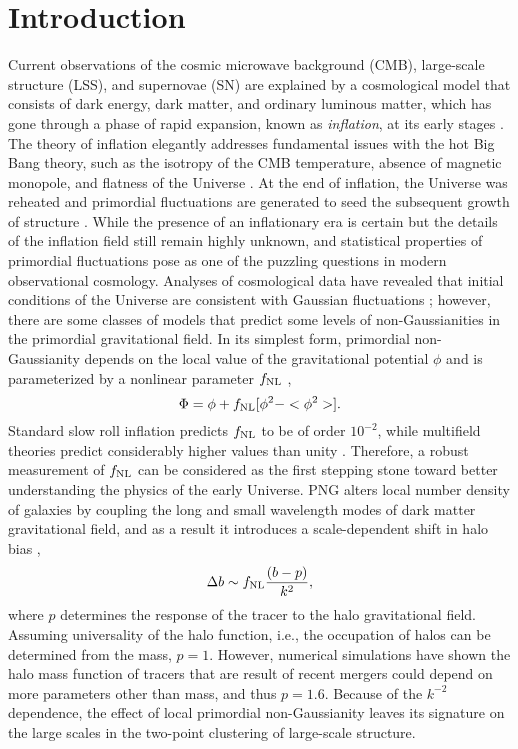 \section{Introduction}
\label{sec:introduction}
Current observations of the cosmic microwave background (CMB), large-scale structure (LSS), and supernovae (SN) are explained by a cosmological model that consists of dark energy, dark matter, and ordinary luminous matter, which has gone through a phase of rapid expansion, known as \textit{inflation},  at its early stages \citep[see, e.g.,][]{weinberg2013observational}. The theory of inflation elegantly addresses fundamental issues with the hot Big Bang theory, such as the isotropy of the CMB temperature, absence of magnetic monopole, and flatness of the Universe . At the end of inflation, the Universe was reheated and primordial fluctuations are generated to seed the subsequent growth of structure . While the presence of an inflationary era is certain but the details of the inflation field still remain highly unknown, and statistical properties of primordial fluctuations pose as one of the puzzling questions in modern observational cosmology. Analyses of cosmological data have revealed that initial conditions of the Universe are consistent with Gaussian fluctuations ; however, there are some classes of models that predict some levels of non-Gaussianities in the primordial gravitational field. In its simplest form, primordial non-Gaussianity depends on the local value of the gravitational potential $\phi$ and is parameterized by a nonlinear parameter $f_{\rm NL}$ \citep{komatsu2001acoustic},
\begin{equation}
    \Phi = \phi + f_{\rm NL} [\phi^{2} -  <\phi^{2}>].
\end{equation}
Standard slow roll inflation predicts $f_{\rm NL}$ to be of order $10^{-2}$, while multifield theories predict considerably higher values than unity . Therefore, a robust measurement of $f_{\rm NL}$ can be considered as the first stepping stone toward better understanding the physics of the early Universe.  PNG alters local number density of galaxies by coupling the long and small wavelength modes of dark matter gravitational field, and as a result it introduces a scale-dependent shift in halo bias \citep[see, e.g.,][]{dalal2008imprints, slosar2008constraints},
\begin{equation}\label{eq:db}
\Delta b \sim f_{\rm NL} \frac{(b - p)}{k^{2}},
\end{equation}
where $p$ determines the response of the tracer to the halo gravitational field. Assuming universality of the halo function, i.e., the occupation of halos can be determined from the mass, $p=1$. However, numerical simulations have shown the halo mass function of tracers that are result of recent mergers could depend on more parameters other than mass, and thus $p=1.6$.  Because of the $k^{-2}$ dependence, the effect of local primordial non-Gaussianity leaves its signature on the large scales in the two-point clustering of large-scale structure. 

